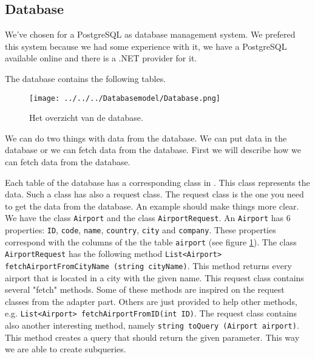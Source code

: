 
\subsection{Database}
We've chosen for a PostgreSQL as database management system. We prefered this system because we had some experience with it, we have a PostgreSQL available online and there is a .NET provider for it.

The database contains the following tables.
\begin{figure}
	\centering
	\texttt{[image: ../../../Databasemodel/Database.png]}
	\caption{Het overzicht van de database.}
	\label{fig:database_design}
\end{figure}

We can do two things with data from the database. We can put data in the database or we can fetch data from the database. First we will describe how we can fetch data from the database.

Each table of the database has a corresponding class in \Csh. This class represents the  data. Such a class has also a request class. The request class is the one you need to get the data from the database. An example should make things more clear. We have the class \texttt{Airport} and the class \texttt{AirportRequest}. An \texttt{Airport} has 6 properties: \texttt{ID}, \texttt{code}, \texttt{name}, \texttt{country}, \texttt{city} and  \texttt{company}. These properties correspond with the columns of the the table \texttt{airport} (see figure \ref{fig:database_design}). The class \texttt{AirportRequest} has the following method \texttt{List<Airport> fetchAirportFromCityName (string cityName)}. This method returns every airport that is located in a city with the given name. This request class contains several "fetch" methods. Some of these methods are inspired on the request classes from the adapter part. Others are just provided to help other methods, e.g. \texttt{List<Airport> fetchAirportFromID(int ID)}. The request class contains also another interesting method, namely \texttt{string toQuery (Airport airport)}. This method creates a query that should return the given parameter. This way we are able to create subqueries.

